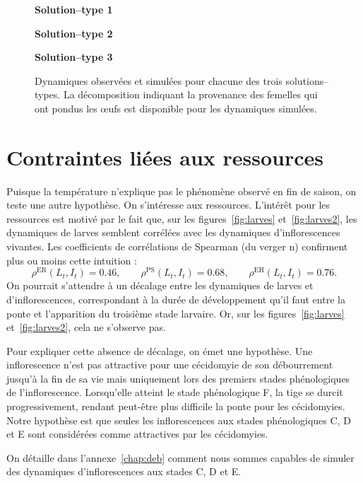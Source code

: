 \begin{figure}[h]
 \centering
 \textbf{Solution--type 1}
 
 
 \textbf{Solution--type 2}
 
 
 \textbf{Solution--type 3}
 
 \caption{Dynamiques observées et simulées pour chacune des trois solutions--types. La décomposition indiquant la provenance des femelles qui ont pondus les œufs est disponible pour les dynamiques simulées.}
 \label{fig:B}
\end{figure}

\clearpage
\section{Contraintes liées aux ressources}

Puisque la température n'explique pas le phénomène observé en fin de saison, on teste une autre hypothèse.
On s'intéresse aux ressources.
L'intérêt pour les ressources est motivé par le fait que, sur les figures~\ref{fig:larves} et~\ref{fig:larves2}, les dynamiques de larves semblent corrélées avec les dynamiques d'inflorescences vivantes.
Les coefficients de corrélations de Spearman (du verger n) confirment plus ou moins cette intuition :
\[
\rho^{\text{ER}}\left( L_t, I_t  \right) =0.46,  \qquad \rho^{\text{PS}}\left( L_t, I_t  \right) =0.68, \qquad \rho^{\text{EH}}\left( L_t, I_t  \right) =0.76.
\]
On pourrait s'attendre à un décalage entre les dynamiques de larves et d'inflorescences, correspondant à la durée de développement qu'il faut entre la ponte et l'apparition du troisième stade larvaire.
Or, sur les figures~\ref{fig:larves} et~\ref{fig:larves2}, cela ne s'observe pas.

Pour expliquer cette absence de décalage, on émet une hypothèse.
Une inflorescence n'est pas attractive pour une cécidomyie de son débourrement jusqu'à la fin de sa vie mais uniquement lors des premiers stades phénologiques de l'inflorescence.
Lorsqu'elle atteint le stade phénologique F, la tige se durcit progressivement, rendant peut-être plus difficile la ponte pour les cécidomyies.
Notre hypothèse est que seules les inflorescences aux stades phénologiques C, D et E sont considérées comme attractives par les cécidomyies.

On détaille dans l'annexe~\ref{chap:deb} comment nous sommes capables de simuler des dynamiques d'inflorescences aux stades C, D et E.

